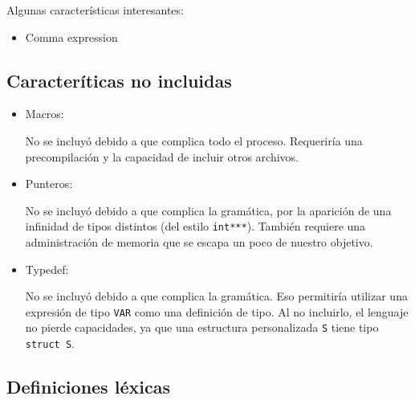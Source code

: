\documentclass[12pt]{article}
\begin{document}
    Algunas caracter\'isticas interesantes:
    \begin{itemize}
        \item Comma expression
    \end{itemize}
    
    \subsection*{Caracter\'iticas no incluidas}
    \begin{itemize}
        \item Macros:
    
        No se incluy\'o debido a que complica todo el proceso. Requerir\'ia una precompilaci\'on y la capacidad de incluir otros archivos.
        \item Punteros:
    
        No se incluy\'o debido a que complica la gram\'atica, por la aparici\'on de una infinidad de tipos distintos (del estilo \texttt{int***}). Tambi\'en requiere una administraci\'on de memoria que se escapa un poco de nuestro objetivo.
    
        \item Typedef:
    
        No se incluy\'o debido a que complica la gram\'atica. Eso permitir\'ia utilizar una expresi\'on de tipo \texttt{VAR} como una definici\'on de tipo. Al no incluirlo, el lenguaje no pierde capacidades, ya que una estructura personalizada \texttt{S} tiene tipo \texttt{struct S}.
    \end{itemize}
    
    \subsection*{Definiciones l\'exicas}
    
\end{document}
